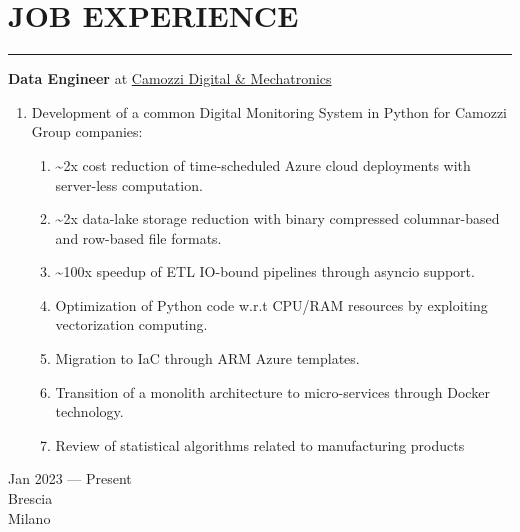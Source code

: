 \documentclass[10pt]{article}
\newcommand{\cvsection}[1]{\section*{\centering\normalsize\uppercase{#1}}\vspace{-16pt}\rule{\linewidth}{0.2pt}\vspace{6pt}}
\begin{document}
\cvsection{Job Experience}
\noindent
\begin{minipage}[t]{.80\textwidth}
	\raggedright
	\textbf{Data Engineer} at \href{https://en.digitalmechatronics.camozzi.com/}{Camozzi Digital \& Mechatronics}
	\begin{enumerate}
		\item Development of a common Digital Monitoring System in Python for Camozzi Group companies:
		\begin{enumerate}
			\item \textasciitilde 2x cost reduction of time-scheduled Azure cloud deployments with server-less computation.
   		\item \textasciitilde 2x data-lake storage reduction with binary compressed columnar-based and row-based file formats.
			\item \textasciitilde 100x speedup of ETL IO-bound pipelines through asyncio support.
    	  \item Optimization of Python code w.r.t CPU/RAM resources by exploiting vectorization computing.
            \item Migration to IaC through ARM Azure templates.
			\item Transition of a monolith architecture to micro-services through Docker technology.
			\item Review of statistical algorithms related to manufacturing products
		\end{enumerate}
  \end{enumerate}
\end{minipage}%
\hspace{.02\textwidth}\vrule\hspace{.02\textwidth}
\begin{minipage}[t]{.16\textwidth}
	\raggedleft
	Jan 2023 --- Present\\
	\small Brescia\\
	\small Milano\\
\end{minipage}%
\noindent
\par\vspace{6pt}
\end{document}
